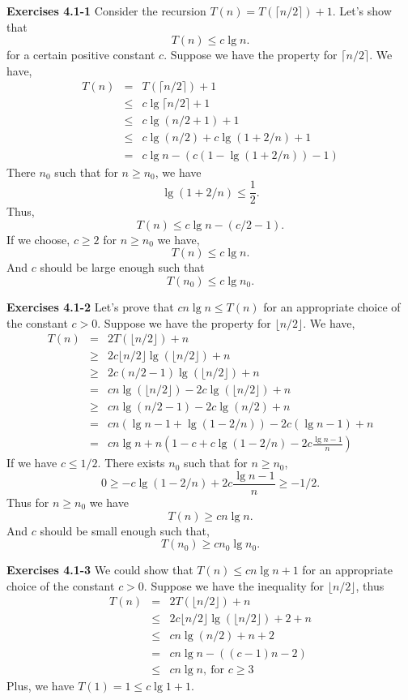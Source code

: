 \documentclass[a4paper,12pt]{article}
\newcommand{\newpar}[1]
{\bigskip \noindent \textbf{Exercises #1} \newline}
\begin{document}
\newpar{4.1-1}
Consider the recursion $T(n) = T(\lceil n/2\rceil) + 1$.  Let's show
that
\[ T(n) \le c \lg n.\]
for a certain positive constant $c$.  Suppose we have the property for 
$\lceil n/2 \rceil$.  We have,
\begin{eqnarray*}
T(n) &=& T(\lceil n/2\rceil) + 1 \\
&\le& c\lg \lceil n/2\rceil + 1 \\
&\le& c\lg(n/2 + 1) + 1 \\
&\le& c\lg(n/2) + c\lg(1 + 2/n) + 1 \\
&=& c\lg n - (c(1 - \lg(1 + 2/n)) - 1)
\end{eqnarray*}
There $n_0$ such that for $n \ge n_0$, we have
\[ \lg(1 + 2/n) \le \frac{1}{2}.\]
Thus,
\[ T(n) \le c\lg n - (c/2 - 1).\]
If we choose, $c \ge 2$ for $n \ge n_0$ we have,
\[ T(n) \le c\lg n.\]
And $c$ should be large enough such that
\[ T(n_0) \le c\lg n_0.\]

\newpar{4.1-2}
Let's prove that $c n\lg n \le T(n)$ for an appropriate choice of the
constant $c > 0$.  Suppose we have the property for $\lfloor n/2
\rfloor$. We have,
\begin{eqnarray*}
T(n) &=& 2 T(\lfloor n/2 \rfloor) + n \\
&\ge& 2c\lfloor n/2\rfloor
\lg(\lfloor n/2\rfloor) + n \\
&\ge&2c(n/2-1) \lg(\lfloor n/2\rfloor) + n \\
&=& c n\lg(\lfloor n/2\rfloor) - 2c\lg(\lfloor n/2\rfloor) + n \\
&\ge& cn\lg(n/2 - 1) - 2c\lg(n/2) + n \\
&=& cn(\lg n - 1 + \lg(1 - 2/n)) - 2c(\lg n-1) + n \\
&=& cn\lg n + n\left(1 - c + c\lg(1-2/n) - 2c\frac{\lg n-1}{n}\right)
\end{eqnarray*}
If we have $c \le 1/2$. There exists $n_0$ such that for $n \ge n_0$,
\[ 0 \ge -c \lg(1-2/n) + 2c\frac{\lg n - 1}{n} \ge -1/2.\]
Thus for $n \ge n_0$ we have
\[ T(n) \ge cn\lg n.\]
And $c$ should be small enough such that,
\[ T(n_0) \ge cn_0\lg n_0.\]

\newpar{4.1-3}
We could show that $T(n) \le cn\lg n + 1$ for an appropriate choice of
the constant $c > 0$.  Suppose we have the inequality for 
$\lfloor n/2 \rfloor$, thus
\begin{eqnarray*}
T(n) &=& 2T(\lfloor n/2\rfloor) + n \\
&\le& 2c\lfloor n/2\rfloor \lg(\lfloor n/2\rfloor) + 2 + n \\
&\le& cn \lg(n/2) + n+2 \\
&=& cn\lg n - ((c-1) n - 2) \\
&\le& cn\lg n,\ \mbox{for $c \ge 3$}
\end{eqnarray*}
Plus, we have $T(1) = 1 \le c \lg 1 + 1$.
\end{document}
